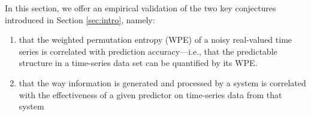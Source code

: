 


In this section, we offer an empirical validation of the two key
conjectures introduced in Section \ref{sec:intro}, namely:

\begin{enumerate}

\item that the weighted permutation entropy (WPE) of a noisy
  real-valued time series is correlated with prediction
  accuracy---i.e., that the predictable structure in a time-series
  data set can be quantified by its WPE.



\item that the way information is generated and processed by a system
  is correlated with the effectiveness of a given predictor on
  time-series data from that system



\end{enumerate}

